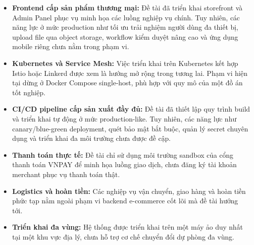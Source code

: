 \documentclass[../DoAn.tex]{subfiles}
\begin{document}
\begin{itemize}
    \item \textbf{Frontend cấp sản phẩm thương mại:} Đề tài đã triển khai storefront và Admin
    Panel phục vụ minh họa các luồng nghiệp vụ chính. Tuy nhiên, các năng lực ở mức production
    như tối ưu trải nghiệm người dùng đa thiết bị, upload file qua object storage, workflow
    kiểm duyệt nâng cao và ứng dụng mobile riêng chưa nằm trong phạm vi.

    \item \textbf{Kubernetes và Service Mesh:} Việc triển khai trên Kubernetes kết hợp Istio
    hoặc Linkerd được xem là hướng mở rộng trong tương lai. Phạm vi hiện tại dừng ở Docker
    Compose single-host, phù hợp với quy mô của một đồ án tốt nghiệp.

    \item \textbf{CI/CD pipeline cấp sản xuất đầy đủ:} Đề tài đã thiết lập quy trình build và
    triển khai tự động ở mức production-like. Tuy nhiên, các năng lực như canary/blue-green
    deployment, quét bảo mật bắt buộc, quản lý secret chuyên dụng và triển khai đa môi trường
    chưa được đề cập.

    \item \textbf{Thanh toán thực tế:} Đề tài chỉ sử dụng môi trường sandbox của cổng thanh
    toán VNPAY để minh họa luồng giao dịch, chưa đăng ký tài khoản merchant phục vụ thanh
    toán thật.

    \item \textbf{Logistics và hoàn tiền:} Các nghiệp vụ vận chuyển, giao hàng và hoàn tiền
    phức tạp nằm ngoài phạm vi backend e-commerce cốt lõi mà đề tài hướng tới.

    \item \textbf{Triển khai đa vùng:} Hệ thống được triển khai trên một máy ảo duy nhất tại
    một khu vực địa lý, chưa hỗ trợ cơ chế chuyển đổi dự phòng đa vùng.
\end{itemize}

\end{document}
